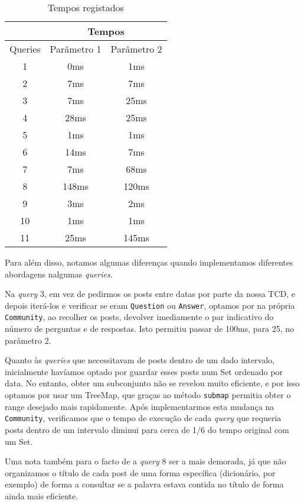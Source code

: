 \documentclass[a4paper]{article}
\begin{document}
	\begin{table}[]
		\label{tab:times}
		\centering

		\begin{tabular}{c|c|c|}
		\cline{2-3}
		& \multicolumn{2}{c|}{Tempos} \\ \hline
		\multicolumn{1}{|c|}{Queries} & Parâmetro 1 & Parâmetro 2 \\ \hline
		\multicolumn{1}{|c|}{1} & 0ms & 1ms \\ \hline
		\multicolumn{1}{|c|}{2} & 7ms & 7ms \\ \hline
		\multicolumn{1}{|c|}{3} & 7ms & 25ms \\ \hline
		\multicolumn{1}{|c|}{4} & 28ms & 25ms \\ \hline
		\multicolumn{1}{|c|}{5} & 1ms & 1ms \\ \hline
		\multicolumn{1}{|c|}{6} & 14ms & 7ms \\ \hline
		\multicolumn{1}{|c|}{7} & 7ms & 68ms \\ \hline
		\multicolumn{1}{|c|}{8} & 148ms & 120ms \\ \hline
		\multicolumn{1}{|c|}{9} & 3ms & 2ms \\ \hline
		\multicolumn{1}{|c|}{10} & 1ms & 1ms \\ \hline
		\multicolumn{1}{|c|}{11} & 25ms & 145ms \\ \hline
		\end{tabular}
		\caption{Tempos registados}
	\end{table}

	\par Para além disso, notamos algumas diferenças quando implementamos diferentes
	abordagens nalgumas \textit{queries}.
	\par Na \textit{query} 3, em vez de pedirmos os posts entre datas por parte
	da nossa TCD, e depois iterá-los e verificar se eram \texttt{Question} ou \texttt{Answer},
	optamos por na própria \texttt{Community}, ao recolher os posts, devolver imediamente
	o par indicativo do número de perguntas e de respostas. Isto permitiu passar de 100ms,
	para 25, no parâmetro 2.
	\par Quanto às \textit{queries} que necessitavam de posts dentro de um dado intervalo,
	inicialmente havíamos optado por guardar esses posts num Set ordenado por data. No entanto,
	obter um subconjunto não se revelou muito eficiente, e por isso optamos por usar um
	TreeMap, que graças ao método \texttt{submap} permitia obter o range desejado
	mais rapidamente. Após implementarmos esta mudança na \texttt{Community}, verificamos
	que o tempo de execução de cada \textit{query} que requeria posts dentro de um intervalo
	diminui para cerca de 1/6 do tempo original com um Set.
	\par Uma nota também para o facto de a \textit{query} 8 ser a mais demorada, já que
	não organizamos o título de cada post de uma forma específica (dicionário, por exemplo)
	de forma a consultar se a palavra estava contida no título de forma ainda mais eficiente.
\end{document}
